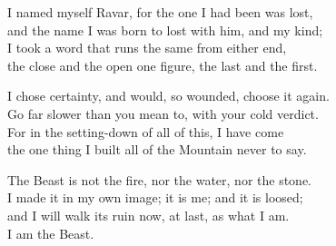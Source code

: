 \begin{founder}
I named myself Ravar, for the one I had been was lost,\\
and the name I was born to lost with him, and my kind;\\
I took a word that runs the same from either end,\\
the close and the open one figure, the last and the first.\\
\medskip

I chose certainty, and would, so wounded, choose it again.\\
Go far slower than you mean to, with your cold verdict.\\
For in the setting-down of all of this, I have come\\
the one thing I built all of the Mountain never to say.\\
\medskip

The Beast is not the fire, nor the water, nor the stone.\\
I made it in my own image; it is me; and it is loosed;\\
and I will walk its ruin now, at last, as what I am.\\
I am the Beast.
\end{founder}
